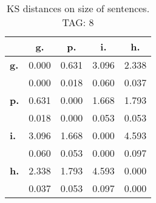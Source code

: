 \begin{table}[h!]
\begin{center}
\begin{tabular}{| l || c | c | c | c |}\hline
 & {\bf g.} & {\bf p.} & {\bf i.} & {\bf h.} \\\hline\hline
{\bf g.} & 0.000 & 0.631 & 3.096 & 2.338 \\
{\bf } & 0.000 & 0.018 & 0.060 & 0.037 \\\hline
{\bf p.} & 0.631 & 0.000 & 1.668 & 1.793 \\
{\bf } & 0.018 & 0.000 & 0.053 & 0.053 \\\hline
{\bf i.} & 3.096 & 1.668 & 0.000 & 4.593 \\
{\bf } & 0.060 & 0.053 & 0.000 & 0.097 \\\hline
{\bf h.} & 2.338 & 1.793 & 4.593 & 0.000 \\
{\bf } & 0.037 & 0.053 & 0.097 & 0.000 \\\hline
\end{tabular}
\caption{KS distances on size of sentences. TAG: 8}
\end{center}
\end{table}